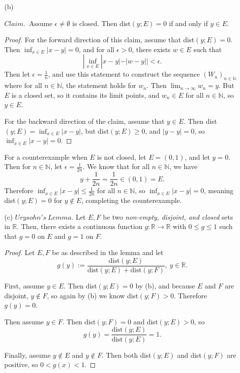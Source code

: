 \documentclass[12pt]{article}
\def\R{\mathbb{R}}
\def\N{\mathbb{N}}
\begin{document}
\begin{itemize}
    \newpage

    \item[(b)]
    
    $Claim.~$ Assume $\epsilon \neq \emptyset$ is closed. Then dist$(y; E) = 0$ if and only if $y \in E$.

    \begin{proof}
        For the forward direction of this claim, assume that dist$(y; E) = 0$. Then $\inf_{x \in E} |x - y| = 0$, and for all $\epsilon > 0$, there exists $w \in E$ such that $$| \inf_{x \in E} |x - y| - |w - y| | < \epsilon.$$ Then let $\epsilon = \frac{1}{n}$, and use this statement to construct the sequence $(W_n)_{n \in \N}$ where for all $n \in \N$, the statement holds for $w_n$. Then $\lim_{n \to \infty} w_n = y$. But $E$ is a closed set, so it contains its limit points, and $w_n \in E$ for all $n \in \N$, so $y \in E$.

        For the backward direction of the claim, assume that $y \in E$. Then dist$(y; E) = \inf_{x \in E} |x - y|$, but dist$(y; E) \geq 0$, and $|y - y| = 0$, so $\inf_{x \in E} |x - y| = 0$.
    \end{proof}

    For a counterexample when $E$ is not closed, let $E = (0,1)$, and let $y = 0$. Then for $n \in \N$, let $\epsilon = \frac{1}{2n}$. We know that for all $n \in \N$, we have $$y + \frac{1}{2n} = \frac{1}{2n} \in (0,1) = E.$$ Therefore $\inf_{x \in E} |x - y| \leq \frac{1}{2n}$ for all $n \in \N$, so $\inf_{x \in E} |x - y| = 0$, meaning dist$(y; E) = 0$ for $y \notin E$, completing the counterexample.

    \item[(c)]
        $Urysohn's~Lemma.$ Let $E, F$ be two \textit{non-empty, disjoint, and closed} sets in $\R$. Then, there exists a continuous function $g : \R \to \R$ with $0 \leq g \leq 1$ such that $g = 0$ on $E$ and $g = 1$ on $F$.

        \begin{proof}
            Let $E, F$ be as described in the lemma and let $$g(y) := \frac{\text{dist}(y; E)}{\text{dist}(y; E) + \text{dist} (y; F)}, ~y \in \R.$$
            
            First, assume $y \in E$. Then dist$(y; E) = 0$ by (b), and because $E$ and $F$ are disjoint, $y \notin F$, so again by (b) we know dist$(y; F) > 0$. Therefore $g(y) = 0$.

            Then assume $y \in F$. Then dist$(y; F) = 0$ and dist$(y; E) > 0$, so $$g(y) = \frac{\text{dist} (y; E)}{\text{dist}(y; E)} = 1.$$

            Finally, assume $y \notin E$ and $y \notin F$. Then both dist$(y; E)$ and dist$(y; F)$ are positive, so $0 < g(x) < 1$.
        \end{proof}
\end{itemize}
\end{document}

